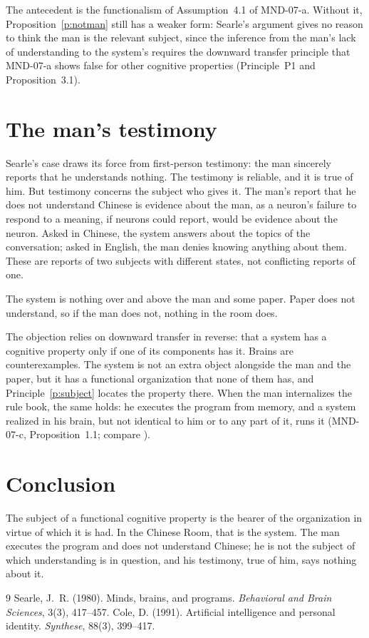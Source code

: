\documentclass{situationist-preprint}
\begin{document}
The antecedent is the functionalism of Assumption~4.1 of MND-07-a. Without it, Proposition~\ref{p:notman} still has a weaker form: Searle's argument gives no reason to think the man is the relevant subject, since the inference from the man's lack of understanding to the system's requires the downward transfer principle that MND-07-a shows false for other cognitive properties (Principle~P1 and Proposition~3.1).

\section{The man's testimony}

Searle's case draws its force from first-person testimony: the man sincerely reports that he understands nothing. The testimony is reliable, and it is true of him. But testimony concerns the subject who gives it. The man's report that he does not understand Chinese is evidence about the man, as a neuron's failure to respond to a meaning, if neurons could report, would be evidence about the neuron. Asked in Chinese, the system answers about the topics of the conversation; asked in English, the man denies knowing anything about them. These are reports of two subjects with different states, not conflicting reports of one.

\begin{objection}
The system is nothing over and above the man and some paper. Paper does not understand, so if the man does not, nothing in the room does.
\end{objection}

\begin{reply}
The objection relies on downward transfer in reverse: that a system has a cognitive property only if one of its components has it. Brains are counterexamples. The system is not an extra object alongside the man and the paper, but it has a functional organization that none of them has, and Principle~\ref{p:subject} locates the property there. When the man internalizes the rule book, the same holds: he executes the program from memory, and a system realized in his brain, but not identical to him or to any part of it, runs it (MND-07-c, Proposition~1.1; compare \citealp{Cole1991}).
\end{reply}

\section{Conclusion}

The subject of a functional cognitive property is the bearer of the organization in virtue of which it is had. In the Chinese Room, that is the system. The man executes the program and does not understand Chinese; he is not the subject of which understanding is in question, and his testimony, true of him, says nothing about it.

\begin{thebibliography}{9}\small
{} Searle, J.~R. (1980). Minds, brains, and programs. \emph{Behavioral and Brain Sciences}, 3(3), 417--457.
 Cole, D. (1991). Artificial intelligence and personal identity. \emph{Synthese}, 88(3), 399--417.
\end{thebibliography}
\end{document}
